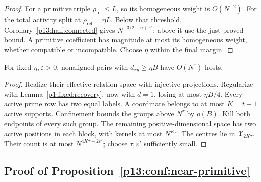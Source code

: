\begin{proof}
For a primitive triple \(\rho_{\mathrm{rel}}\le L\),
so its homogeneous weight is \(O(N^{-2})\).
For the total activity split at \(\rho_{\mathrm{rel}}=\eta L\).
Below that threshold,
Corollary~\ref{p13:half:connected} gives
\(N^{-3/2+\eta+\varepsilon'}\); above it use the just
proved bound. A primitive coefficient has magnitude
at most its homogeneous weight, whether compatible
or incompatible. Choose \(\eta\) within the final margin.
\end{proof}

\begin{corollary}
\label{p13:conf:dense-pairs}
For fixed \(\eta,\varepsilon>0\), nonaligned pairs
with \(d_{xy}\ge\eta B\) have \(O(N^\varepsilon)\)
hosts.
\end{corollary}

\begin{proof}
Realize their effective relation space with injective
projections. Regularize with
Lemma~\ref{p1:fixed:recovery}, now with \(d=1\),
losing at most \(\eta B/4\).
Every active prime row has two equal labels.
A coordinate belongs to at most \(K=t-1\) active supports.
Confinement bounds the groups above \(N^\tau\) by \(o(B)\).
Kill both endpoints of every such group.
The remaining positive-dimensional space has two active
positions in each block, with kernels at most \(N^{K\tau}\).
The centres lie in \(\mathcal X_{2K\tau}\).
Their count is at most \(N^{4K\tau+2\varepsilon'}\);
choose \(\tau,\varepsilon'\) sufficiently small.
\end{proof}


\subsection{Proof of Proposition~\ref{p13:conf:near-primitive}}
\label{p14:comp:confinement:near}

